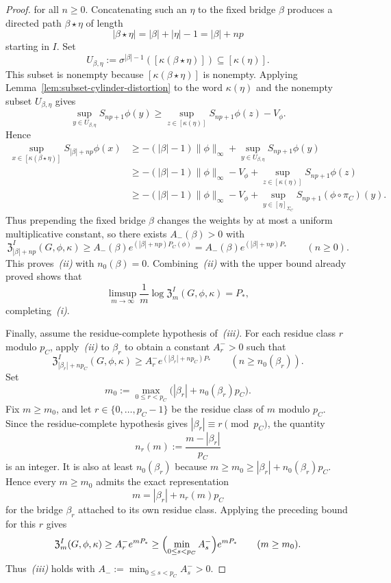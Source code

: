 \documentclass{etds}%
\numberwithin{equation}{section}
\theoremstyle{plain}
\theoremstyle{definition}
\theoremstyle{remark}
\begin{document}
\begin{proof}
for all $n\ge0$.  Concatenating such an $\eta$ to the fixed bridge $\beta$
produces a directed path $\beta\star\eta$ of
length
\[
|\beta\star\eta|
=|\beta|+|\eta|-1
=|\beta|+np
\]
starting in $I$.  Set
\[
U_{\beta,\eta}
:=\sigma^{|\beta|-1}([\kappa(\beta\star\eta)])
\subseteq[\kappa(\eta)].
\]
This subset is nonempty because $[\kappa(\beta\star\eta)]$ is nonempty.
Applying Lemma~\ref{lem:subset-cylinder-distortion} to the word $\kappa(\eta)$
and the nonempty subset $U_{\beta,\eta}$ gives
\[
\sup_{y\in U_{\beta,\eta}}S_{np+1}\phi(y)
\ge
\sup_{z\in[\kappa(\eta)]}S_{np+1}\phi(z)-V_\phi.
\]
Hence
\begin{align*}
\sup_{x\in[\kappa(\beta\star\eta)]}S_{|\beta|+np}\phi(x)
&\ge
-(|\beta|-1)\|\phi\|_\infty
+\sup_{y\in U_{\beta,\eta}}S_{np+1}\phi(y)\\
&\ge
-(|\beta|-1)\|\phi\|_\infty
-V_\phi
+\sup_{z\in[\kappa(\eta)]}S_{np+1}\phi(z)\\
&\ge
-(|\beta|-1)\|\phi\|_\infty
-V_\phi
+\sup_{y\in[\eta]_{\Sigma_C}}S_{np+1}(\phi\circ\pi_C)(y).
\end{align*}
Thus prepending the fixed bridge $\beta$ changes the weights by at most a
uniform multiplicative constant, so there exists $A_-(\beta)>0$ with
\[
\mathfrak{Z}_{|\beta|+np}^I(G,\phi,\kappa)
\ge A_-(\beta)e^{(|\beta|+np)P_C(\phi)}
=A_-(\beta)e^{(|\beta|+np)P_*}
\qquad(n\ge 0).
\]
This proves~\emph{(ii)} with $n_0(\beta)=0$.  Combining~\emph{(ii)} with the upper bound already
proved shows that
\[
\limsup_{m\to\infty}\frac1m
\log\mathfrak{Z}_m^I(G,\phi,\kappa)=P_*,
\]
completing~\emph{(i)}.

Finally, assume the residue-complete hypothesis of~\emph{(iii)}.
For each residue class $r$ modulo $p_C$, apply~\emph{(ii)} to $\beta_r$ to
obtain a constant $A_r^->0$ such that
\[
\mathfrak{Z}_{|\beta_r|+np_C}^I(G,\phi,\kappa)
\ge A_r^-e^{(|\beta_r|+np_C)P_*}
\qquad(n\ge n_0(\beta_r)).
\]
Set
\[
m_0:=\max_{0\le r<p_C}\bigl(|\beta_r|+n_0(\beta_r)p_C\bigr).
\]
Fix $m\ge m_0$, and let $r\in\{0,\dots,p_C-1\}$ be the residue class of $m$
modulo $p_C$.  Since the residue-complete hypothesis gives
$|\beta_r|\equiv r\pmod{p_C}$, the quantity
\[
n_r(m):=\frac{m-|\beta_r|}{p_C}
\]
is an integer.  It is also at least $n_0(\beta_r)$ because
$m\ge m_0\ge |\beta_r|+n_0(\beta_r)p_C$.
Hence every $m\ge m_0$ admits the exact representation
\[
m=|\beta_r|+n_r(m)p_C
\]
for the bridge $\beta_r$ attached to its own residue class.  Applying the
preceding bound for this $r$ gives
\[
\mathfrak{Z}_m^I(G,\phi,\kappa)
\ge A_r^-e^{mP_*}
\ge \Bigl(\min_{0\le s<p_C}A_s^-\Bigr)e^{mP_*}
\qquad(m\ge m_0).
\]
Thus~\emph{(iii)} holds with
$A_-:=\min_{0\le s<p_C}A_s^- >0$.
\end{proof}
\end{document}
